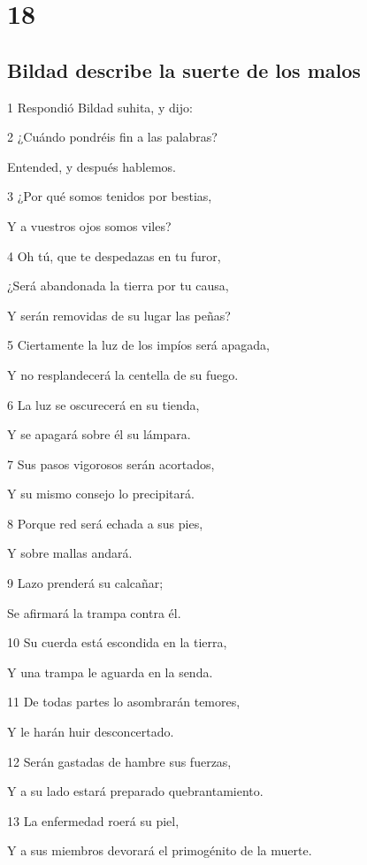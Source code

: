 \chapter{18}

\section*{Bildad describe la suerte de los malos}

\par 1 Respondió Bildad suhita, y dijo:
\par 2 ¿Cuándo pondréis fin a las palabras?
\par Entended, y después hablemos.
\par 3 ¿Por qué somos tenidos por bestias,
\par Y a vuestros ojos somos viles?
\par 4 Oh tú, que te despedazas en tu furor,
\par ¿Será abandonada la tierra por tu causa,
\par Y serán removidas de su lugar las peñas? 
\par 5 Ciertamente la luz de los impíos será apagada,
\par Y no resplandecerá la centella de su fuego.
\par 6 La luz se oscurecerá en su tienda,
\par Y se apagará sobre él su lámpara.
\par 7 Sus pasos vigorosos serán acortados,
\par Y su mismo consejo lo precipitará.
\par 8 Porque red será echada a sus pies,
\par Y sobre mallas andará.
\par 9 Lazo prenderá su calcañar;
\par Se afirmará la trampa contra él.
\par 10 Su cuerda está escondida en la tierra,
\par Y una trampa le aguarda en la senda.
\par 11 De todas partes lo asombrarán temores,
\par Y le harán huir desconcertado.
\par 12 Serán gastadas de hambre sus fuerzas,
\par Y a su lado estará preparado quebrantamiento.
\par 13 La enfermedad roerá su piel,
\par Y a sus miembros devorará el primogénito de la muerte.
